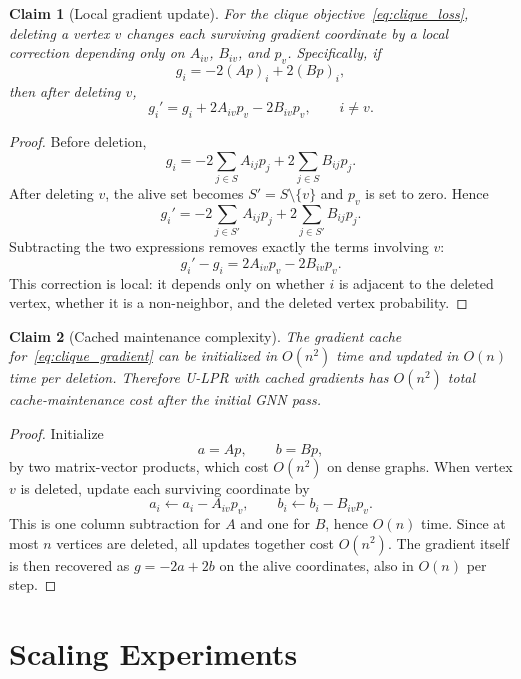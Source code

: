 \documentclass[mathematics,article,submit,pdftex,moreauthors]{Definitions/mdpi}
\newtheorem{claim}{Claim}[section]
\begin{document}
\begin{claim}[Local gradient update]
  \label{claim:local_gradient}
  For the clique objective~\eqref{eq:clique_loss}, deleting a vertex $v$ changes each
  surviving gradient coordinate by a local correction depending only on $A_{iv}$,
  $B_{iv}$, and $p_v$. Specifically, if
  \[
    g_i=-2(Ap)_i+2(Bp)_i,
  \]
  then after deleting $v$,
  \[
    g_i' = g_i + 2A_{iv}p_v - 2B_{iv}p_v,
    \qquad i\neq v.
  \]
\end{claim}

\begin{proof}
  Before deletion,
  \[
    g_i=-2\sum_{j\in S} A_{ij}p_j
    +2\sum_{j\in S} B_{ij}p_j .
  \]
  After deleting $v$, the alive set becomes $S'=S\setminus\{v\}$ and $p_v$ is set to
  zero. Hence
  \[
    g_i'
    =
    -2\sum_{j\in S'} A_{ij}p_j
    +2\sum_{j\in S'} B_{ij}p_j .
  \]
  Subtracting the two expressions removes exactly the terms involving $v$:
  \[
    g_i'-g_i
    =
    2A_{iv}p_v - 2B_{iv}p_v .
  \]
  This correction is local: it depends only on whether $i$ is adjacent to the deleted
  vertex, whether it is a non-neighbor, and the deleted vertex probability.
\end{proof}

\begin{claim}[Cached maintenance complexity]
  \label{claim:cache_complexity}
  The gradient cache for~\eqref{eq:clique_gradient} can be initialized in $O(n^2)$
  time and updated in $O(n)$ time per deletion. Therefore U-LPR with cached gradients
  has $O(n^2)$ total cache-maintenance cost after the initial GNN pass.
\end{claim}

\begin{proof}
  Initialize
  \[
    a=Ap,\qquad b=Bp,
  \]
  by two matrix-vector products, which cost $O(n^2)$ on dense graphs. When vertex
  $v$ is deleted, update each surviving coordinate by
  \[
    a_i \leftarrow a_i-A_{iv}p_v,
    \qquad
    b_i \leftarrow b_i-B_{iv}p_v .
  \]
  This is one column subtraction for $A$ and one for $B$, hence $O(n)$ time. Since at
  most $n$ vertices are deleted, all updates together cost $O(n^2)$. The gradient
  itself is then recovered as $g=-2a+2b$ on the alive coordinates, also in $O(n)$ per
  step.
\end{proof}

\section{Scaling Experiments}
\label{app:scaling}
\end{document}
